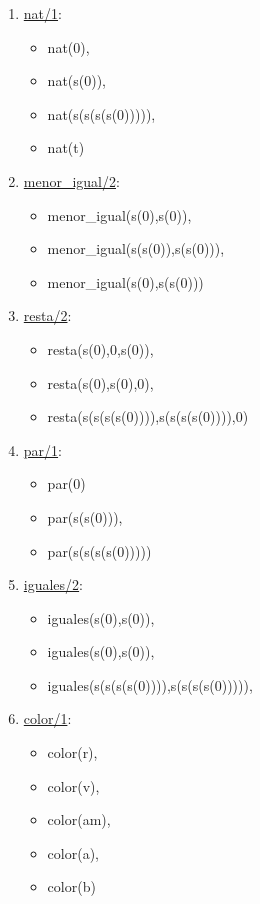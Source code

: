 \documentclass[12pt, a4paper, spanish]{article}
\begin{document}
\begin{enumerate}
	\item \underline{nat/1}:
	\begin{itemize}
	\item nat(0),            
	\item nat(s(0)),
	\item nat(s(s(s(s(0))))),
	\item nat(t)
	\end{itemize}
	
	\item \underline{menor\_igual/2}:
	\begin{itemize}
	\item menor\_igual(s(0),s(0)),             
	\item menor\_igual(s(s(0)),s(s(0))),
	\item menor\_igual(s(0),s(s(0)))
	\end{itemize}

\item \underline{resta/2}:
\begin{itemize}
	\item resta(s(0),0,s(0)),            
	\item resta(s(0),s(0),0),             
	\item resta(s(s(s(s(0)))),s(s(s(s(0)))),0)
\end{itemize}

\item \underline{par/1}:
\begin{itemize}
	\item par(0)             
	\item par(s(s(0))),             
	\item par(s(s(s(s(0)))))
\end{itemize}

\item \underline{iguales/2}:
\begin{itemize}
	\item iguales(s(0),s(0)),             
	\item iguales(s(0),s(0)),             
	\item iguales(s(s(s(s(0)))),s(s(s(s(0))))),
\end{itemize}

\item \underline{color/1}:
\begin{itemize}
	\item color(r),             
	\item color(v),             
	\item color(am),
	\item color(a),
	\item color(b)
\end{itemize}


\end{enumerate}
\end{document}

